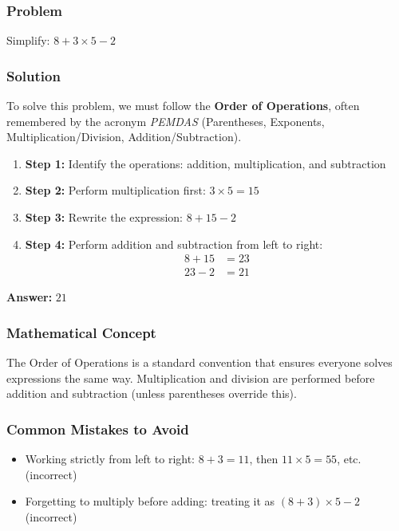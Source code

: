 \documentclass[12pt]{article}
\begin{document}
\subsubsection*{Problem}
Simplify: $8 + 3 \times 5 - 2$

\subsubsection*{Solution}

To solve this problem, we must follow the \textbf{Order of Operations}, often remembered by the acronym \textit{PEMDAS} (Parentheses, Exponents, Multiplication/Division, Addition/Subtraction).

\begin{enumerate}
\item \textbf{Step 1:} Identify the operations: addition, multiplication, and subtraction
\item \textbf{Step 2:} Perform multiplication first: $3 \times 5 = 15$
\item \textbf{Step 3:} Rewrite the expression: $8 + 15 - 2$
\item \textbf{Step 4:} Perform addition and subtraction from left to right:
  \begin{align*}
  8 + 15 &= 23 \\
  23 - 2 &= 21
  \end{align*}
\end{enumerate}

\textbf{Answer: } $21$

\subsubsection*{Mathematical Concept}
The Order of Operations is a standard convention that ensures everyone solves expressions the same way. Multiplication and division are performed before addition and subtraction (unless parentheses override this).

\subsubsection*{Common Mistakes to Avoid}
\begin{itemize}
\item Working strictly from left to right: $8 + 3 = 11$, then $11 \times 5 = 55$, etc. (incorrect)
\item Forgetting to multiply before adding: treating it as $(8 + 3) \times 5 - 2$ (incorrect)
\end{itemize}
\end{document}
